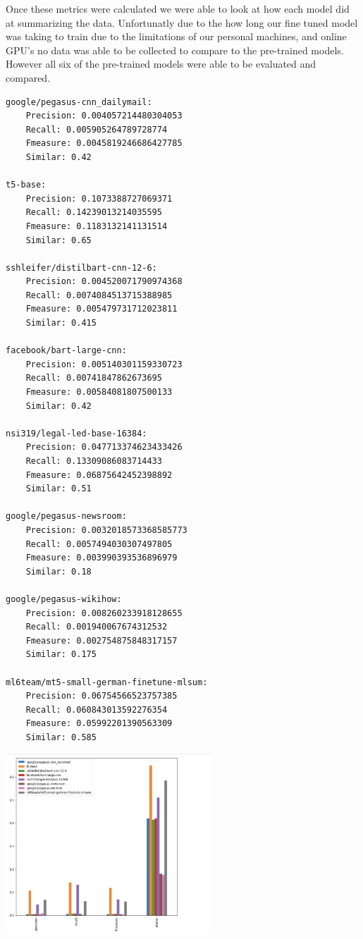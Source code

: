\documentclass[twoside,twocolumn]{article}
\begin{document}
Once these metrics were calculated we were able to look at how each model did at summarizing the data. Unfortunatly due to the how long our fine tuned model was taking to train due to the limitations of our personal machines, and online GPU's no data was able to be collected to compare to the pre-trained models. However all six of the pre-trained models were able to be evaluated and compared. 

\begin{verbatim}
google/pegasus-cnn_dailymail:
	Precision: 0.004057214480304053
	Recall: 0.005905264789728774
	Fmeasure: 0.0045819246686427785
	Similar: 0.42
	
t5-base:
	Precision: 0.1073388727069371
	Recall: 0.14239013214035595
	Fmeasure: 0.1183132141131514
	Similar: 0.65
	
sshleifer/distilbart-cnn-12-6:
	Precision: 0.004520071790974368
	Recall: 0.0074084513715388985
	Fmeasure: 0.005479731712023811
	Similar: 0.415
	
facebook/bart-large-cnn:
	Precision: 0.005140301159330723
	Recall: 0.00741847862673695
	Fmeasure: 0.00584081807500133
	Similar: 0.42
	
nsi319/legal-led-base-16384:
	Precision: 0.047713374623433426
	Recall: 0.13309086083714433
	Fmeasure: 0.06875642452398892
	Similar: 0.51
	
google/pegasus-newsroom:
	Precision: 0.0032018573368585773
	Recall: 0.0057494030307497805
	Fmeasure: 0.003990393536896979
	Similar: 0.18
	
google/pegasus-wikihow:
	Precision: 0.008260233918128655
	Recall: 0.001940067674312532
	Fmeasure: 0.002754875848317157
	Similar: 0.175
	
ml6team/mt5-small-german-finetune-mlsum:
	Precision: 0.06754566523757385
	Recall: 0.060843013592276354
	Fmeasure: 0.05992201390563309
	Similar: 0.585
\end{verbatim}
\includegraphics[width=0.58\textwidth,height=0.8\textheight,keepaspectratio]{report/cnn-graph.png}
\end{document}
